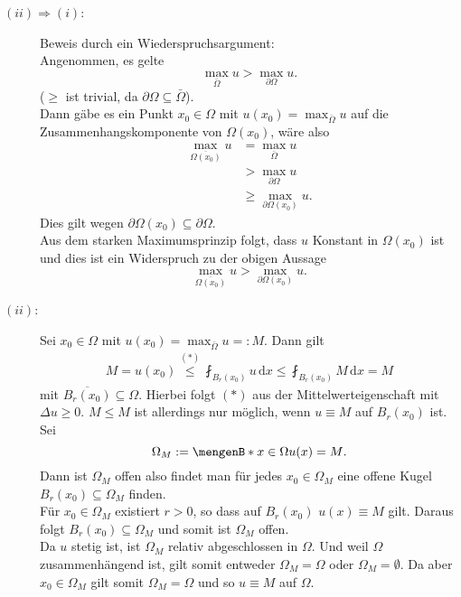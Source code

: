 \begin{beweis}
	\begin{description}
		\item[\underline{$(ii) \Rightarrow (i)$}:] Beweis durch ein Wiederspruchsargument: \\
		Angenommen, es gelte 
		\begin{equation}
			\max_{\bar{\Omega}}u > \max_{\partial \Omega} u.
		\end{equation}
		($\geq$ ist trivial, da $\partial \Omega \subseteq \bar{\Omega}$). \\
		Dann gäbe es ein Punkt $x_0 \in \Omega$ mit $u(x_0) = \max_{\bar{\Omega}}u$ auf die Zusammenhangskomponente von $\Omega(x_0)$, wäre also
		\begin{align*}
			\max_{\overline{\Omega(x_0)}}u &= \max_{\bar{\Omega}}u \\
			&> \max_{\partial \Omega}u \\
			&\geq  \max_{ \partial \Omega(x_0)}u.
		\end{align*}
		Dies gilt wegen $ \partial \Omega(x_0) \subseteq \partial \Omega$. \\
		Aus dem starken Maximumsprinzip folgt, dass $u$ Konstant in $\Omega(x_0)$ ist und dies ist ein Widerspruch zu der obigen Aussage
		\[
			\max_{\overline{\Omega(x_0)}}u > \max_{\partial \Omega(x_0)} u.
		\]
		\item[\underline{$(ii)$}:] Sei $x_0 \in \Omega$ mit $u(x_0) = \max_{\bar{\Omega}}u =: M$. Dann gilt
		\begin{align*}
			M = u(x_0) \stackrel{(*)}{\leq } \fint_{B_r(x_0)}^{} u \,\mathrm{d}x \leq  \fint_{B_r(x_0)}^{} M \,\mathrm{d}x = M 
		\end{align*}
		mit $\overline{B_r(x_0)} \subseteq \Omega$. Hierbei folgt $(*)$ aus der Mittelwerteigenschaft mit $ \Delta u \geq 0$. $M \leq M$ ist allerdings nur möglich, 
		wenn $u \equiv M$ auf $B_r(x_0)$ ist. Sei
		\[
			\Omega_M := \set[x \in \Omega]{u(x)=M}.
		\]
		Dann ist $\Omega_M$ offen also findet man für jedes $x_0 \in \Omega_M$ eine offene Kugel $B_r(x_0) \subseteq \Omega_M$ finden. \\
		Für $x_0 \in \Omega_M$ existiert $r>0$, so dass auf $B_r(x_0)$ $u(x) \equiv M$ gilt. 
		Daraus folgt $B_r(x_0) \subseteq  \Omega_M$ und somit ist $\Omega_M$ offen. \\
		Da $u$ stetig ist, ist $\Omega_M$ relativ abgeschlossen in $\Omega$. 
		Und weil $\Omega$ zusammenhängend ist, gilt somit entweder $\Omega_M = \Omega$ oder $\Omega_M = \emptyset$.
		Da aber $x_0 \in \Omega_M$ gilt somit $\Omega_M = \Omega$ und so $u \equiv M$ auf $\Omega$.
	\end{description}
\end{beweis}

